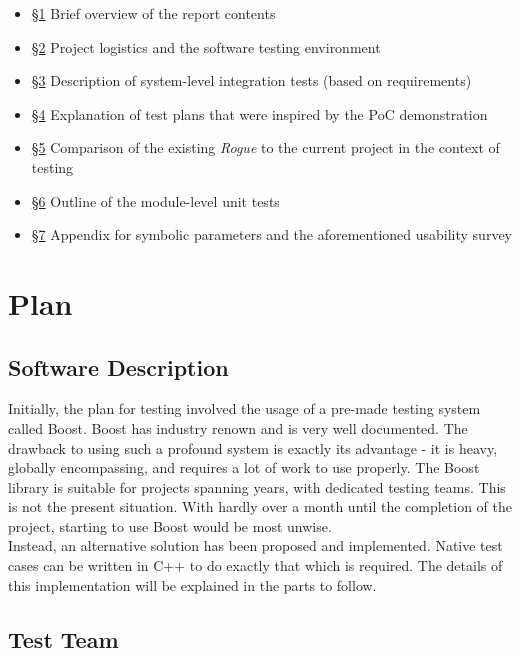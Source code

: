 \documentclass[12pt, titlepage]{article}
\begin{document}
		\begin{itemize}
			\item \hyperref[section1]{\S 1} Brief overview of the report contents
			\item \hyperref[section2]{\S 2} Project logistics and the software testing environment
			\item \hyperref[section3]{\S 3} Description of system-level integration tests (based on requirements)
			\item \hyperref[section4]{\S 4} Explanation of test plans that were inspired by the PoC demonstration
			\item \hyperref[section5]{\S 5} Comparison of the existing \textit{Rogue} to the current project in the context of testing
			\item \hyperref[section6]{\S 6} Outline of the module-level unit tests 
			\item \hyperref[section7]{\S 7} Appendix for symbolic parameters and the aforementioned usability survey
		\end{itemize}

\newpage
\section{Plan}
\label{section2}
		
	\subsection{Software Description}

	Initially, the plan for testing involved the usage of a pre-made testing system called Boost. Boost has industry renown and is very well documented. The drawback to using such a profound system is exactly its advantage - it is heavy, globally encompassing, and requires a lot of work to use properly. The Boost library is suitable for projects spanning years, with dedicated testing teams. This is not the present situation. With hardly over a month until the completion of the project, starting to use Boost would be most unwise.\\

	Instead, an alternative solution has been proposed and implemented. Native test cases can be written in C++ to do exactly that which is required. The details of this implementation will be explained in the parts to follow.

	\subsection{Test Team}
\end{document}
